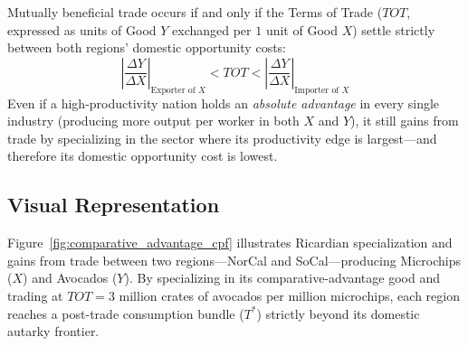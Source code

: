 \documentclass[11pt,letterpaper]{article}
\begin{document}
\begin{coreprinciple}
Mutually beneficial trade occurs if and only if the Terms of Trade ($TOT$, expressed as units of Good $Y$ exchanged per $1$ unit of Good $X$) settle strictly between both regions' domestic opportunity costs:
\begin{equation}
\left|\frac{\Delta Y}{\Delta X}\right|_{\text{Exporter of } X} < TOT < \left|\frac{\Delta Y}{\Delta X}\right|_{\text{Importer of } X}
\end{equation}
Even if a high-productivity nation holds an \emph{absolute advantage} in every single industry (producing more output per worker in both $X$ and $Y$), it still gains from trade by specializing in the sector where its productivity edge is largest—and therefore its domestic opportunity cost is lowest.
\end{coreprinciple}

\subsection*{Visual Representation}
Figure~\ref{fig:comparative_advantage_cpf} illustrates Ricardian specialization and gains from trade between two regions—NorCal and SoCal—producing Microchips ($X$) and Avocados ($Y$). By specializing in its comparative-advantage good and trading at $TOT = 3$ million crates of avocados per million microchips, each region reaches a post-trade consumption bundle ($T^*$) strictly beyond its domestic autarky frontier.
\end{document}
